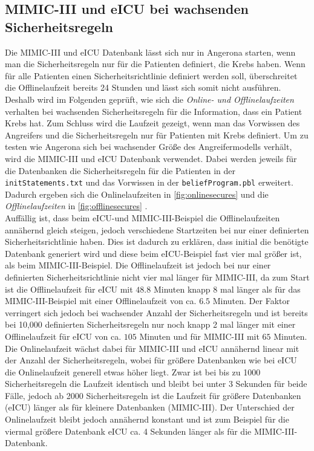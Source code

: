 \documentclass[german,version-2020-11]{uzl-thesis}
\begin{document}
\subsection{MIMIC-III und eICU bei wachsenden Sicherheitsregeln}
Die MIMIC-III und eICU Datenbank lässt sich nur in Angerona starten, wenn man die Sicherheitsregeln nur für die Patienten definiert, die Krebs haben. Wenn für alle Patienten einen Sicherheitsrichtlinie definiert werden soll, überschreitet die Offlinelaufzeit bereits 24 Stunden und lässt sich somit nicht ausführen. Deshalb wird im Folgenden geprüft, wie sich die \emph{Online- und Offlinelaufzeiten} verhalten bei wachsenden Sicherheitsregeln für die Information, dass ein Patient Krebs hat. Zum Schluss wird die Laufzeit gezeigt, wenn man das Vorwissen des Angreifers und die Sicherheitsregeln nur für Patienten mit Krebs definiert.
Um zu testen wie Angerona sich bei wachsender Größe des Angreifermodells verhält, wird die MIMIC-III und eICU Datenbank verwendet. Dabei werden jeweils für die Datenbanken die Sicherheitsregeln für die Patienten in der \texttt{initStatements.txt} und das Vorwissen in der \texttt{beliefProgram.pbl} erweitert. Dadurch ergeben sich die Onlinelaufzeiten in \autoref{fig:onlinesecures} und die \emph{Offlinelaufzeiten} in \autoref{fig:offlinesecures} . \\ 
Auffällig ist, dass beim eICU-und MIMIC-III-Beispiel die Offlinelaufzeiten annähernd gleich steigen, jedoch verschiedene Startzeiten bei nur einer definierten  Sicherheitsrichtlinie haben. Dies ist dadurch zu erklären, dass initial die benötigte Datenbank generiert wird und diese beim eICU-Beispiel fast vier mal größer ist, als beim MIMIC-III-Beispiel. Die Offlinelaufzeit ist jedoch bei nur einer definierten Sicherheitsrichtlinie nicht vier mal länger für MIMIC-III, da zum Start ist die Offlinelaufzeit für eICU mit $48.8$ Minuten knapp 8 mal länger als für das MIMIC-III-Beispiel mit einer Offlinelaufzeit von ca. $6.5$ Minuten. Der Faktor verringert sich jedoch bei wachsender Anzahl der Sicherheitsregeln und ist bereits bei 10,000 definierten Sicherheitsregeln nur noch knapp 2 mal länger mit einer Offlinelaufzeit für eICU von ca. $105$ Minuten und für MIMIC-III mit $65$ Minuten. \\ 
Die Onlinelaufzeit wächst dabei für MIMIC-III und eICU annähernd linear mit der Anzahl der Sicherheitsregeln, wobei für größere Datenbanken wie bei eICU die Onlinelaufzeit generell etwas höher liegt. Zwar ist bei bis zu 1000 Sicherheitsregeln die Laufzeit identisch und bleibt bei unter 3 Sekunden für beide Fälle, jedoch ab 2000 Sicherheitsregeln ist die Laufzeit für größere Datenbanken (eICU) länger als für kleinere Datenbanken (MIMIC-III). Der Unterschied der Onlinelaufzeit bleibt jedoch annähernd konstant und ist zum Beispiel für die viermal größere Datenbank eICU ca. 4 Sekunden länger als für die MIMIC-III-Datenbank. 
\end{document}
